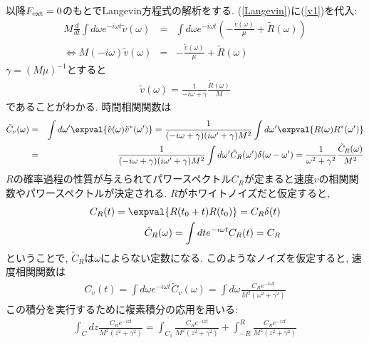 \documentclass[10.5pt,a4paper]{jreport}
\begin{document}
以降$F_{\rm ext} = 0$のもとでLangevin方程式の解析をする. (\ref{Langevin})に(\ref{v1})を代入:
\begin{eqnarray}
  M\frac{d}{dt}\int d\omega e^{-i\omega t}\tilde{v}(\omega) &=& \int d\omega e^{-i\omega t}\left(-\frac{\tilde{v}(\omega)}{\mu} + \tilde{R}(\omega)\right)  \\
  \Longleftrightarrow M(-i\omega)\tilde{v}(\omega) &=&  -\frac{\tilde{v}(\omega)}{\mu} + \tilde{R}(\omega)
\end{eqnarray}
$\gamma = (M\mu)^{-1}$とすると
\begin{eqnarray}
  \tilde{v}(\omega) = \frac{1}{-i\omega + \gamma}\frac{\tilde{R}(\omega)}{M}
\end{eqnarray}
であることがわかる. 時間相関関数は
\begin{eqnarray}
  \tilde{C}_v(\omega) &=& \int d\omega' \expval{\tilde{v}(\omega)\tilde{v}^*(\omega')} = \frac{1}{(-i\omega + \gamma)(i\omega' + \gamma)M^2}\int d\omega' \expval{R(\omega)R^*(\omega')}\\
  &=& \frac{1}{(-i\omega + \gamma)(i\omega' + \gamma)M^2}\int d\omega' \tilde{C}_R(\omega')\delta(\omega-\omega') = \frac{1}{\omega^2 + \gamma^2}\frac{\tilde{C}_R(\omega)}{M^2}
\end{eqnarray}
$R$の確率過程の性質が与えられてパワースペクトル$C_R$が定まると速度$v$の相関関数やパワースペクトルが決定される. $R$がホワイトノイズだと仮定すると,
\begin{eqnarray}
  C_R(t) = \expval{R(t_0+t)R(t_0)} = C_R\delta(t)\\
  \tilde{C}_R(\omega) = \int dt e^{-i\omega t}C_R(t) = C_R
\end{eqnarray}
ということで, $\tilde{C}_R$は$\omega$によらない定数になる. このようなノイズを仮定すると, 速度相関関数は
\begin{eqnarray}
  C_v(t) = \int d\omega e^{-i\omega t}\tilde{C}_v(\omega) = \int d\omega \frac{C_Re^{-i\omega t}}{M^2(\omega^2 + \gamma^2)}
\end{eqnarray}
この積分を実行するために複素積分の応用を用いる:
\begin{eqnarray}
  \int_C dz \frac{C_Re^{-izt}}{M^2(z^2 + \gamma^2)} = \int_{C_1} \frac{C_Re^{-izt}}{M^2(z^2 + \gamma^2)} + \int_{-R}^R \frac{C_Re^{-izt}}{M^2(z^2 + \gamma^2)}
\end{eqnarray}
\end{document}
